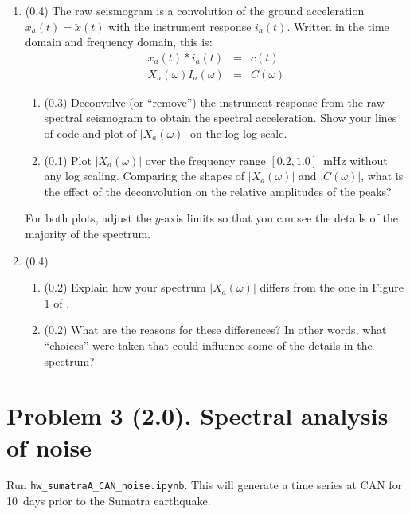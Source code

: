 \documentclass[11pt,titlepage,fleqn]{article}
\newcommand{\tfilenoise}{{\tt hw\_sumatraA\_CAN\_noise.ipynb}}
\begin{document}
\begin{enumerate}

\item (0.4) The raw seismogram is a convolution of the ground acceleration $x_a(t) = \ddot{x}(t)$ with the instrument response $i_a(t)$. Written in the time domain and frequency domain, this is:
%
\begin{eqnarray}
x_a(t) * i_a(t) &=& c(t)
\\
X_a(\omega) I_a(\omega) &=& C(\omega)
\end{eqnarray}

\begin{enumerate}
\item (0.3) Deconvolve (or ``remove'') the instrument response from the raw spectral seismogram to obtain the spectral acceleration. Show your lines of code and plot of $|X_a(\omega)|$ on the log-log scale.

\item (0.1) Plot $|X_a(\omega)|$ over the frequency range $[0.2,1.0]$~mHz without any log scaling. Comparing the shapes of $|X_a(\omega)|$ and $|C(\omega)|$, what is the effect of the deconvolution on the relative amplitudes of the peaks?
\end{enumerate}
%
For both plots, adjust the $y$-axis limits so that you can see the details of the majority of the spectrum.


\item (0.4) \ptag\ 
%
\begin{enumerate}
\item (0.2) Explain how your spectrum $|X_a(\omega)|$ differs from the one in Figure 1 of \citet{Park2005}.

\item (0.2) What are the reasons for these differences? In other words, what ``choices'' were taken that could influence some of the details in the spectrum?
\end{enumerate}

\end{enumerate}


\pagebreak
\section*{Problem 3 (2.0). Spectral analysis of noise}

Run \tfilenoise. This will generate a time series at CAN for 10~days prior to the Sumatra earthquake.
\end{document}
